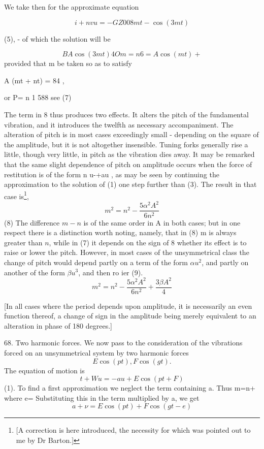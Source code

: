 We take then for the approximate equation

\[i+nvu=- GZ 008 mt -  \cos(3mt)\]

(5), - of which the solution will be

\[BA \cos(3mt) 4 Om =n 6 =A \cos(mt) +\]
 provided that m be taken so as to satisfy

A (mt + nt) = 84 ,

or P= n 1 588 see (7)

The term in 8 thus produces two effects. It alters the pitch of the fundamental
vibration, and it introduces the twelfth as necessary accompaniment. The
alteration of pitch is in most cases exceedingly small - depending on the
square of the amplitude, but it is not altogether insensible. Tuning forks
generally rise a little, though very little, in pitch as the vibration dies
away. It may be remarked that the same slight dependence of pitch on amplitude
occurs when the force of restitution is of the form n u-+au , as may be seen by
continuing the approximation to the solution of (1) one step further than (3).
The result in that case is\footnote{[A correction is here introduced, the
necessity for which was pointed out to me by Dr Barton.]},
\[ m^2 = n^2 - \frac{5 \alpha^2 A^2 }{6 n^2} \]
 (8) The difference \(m-n\) is of the same
order in A in both cases; but in one respect there is a distinction worth
noting, namely, that in (8) m is always greater than \(n\), while in (7) it
depends on the sign of 8 whether its effect is to raise or lower the pitch.
However, in most cases of the unsymmetrical class the change of pitch would
depend partly on a term of the form \(\alpha u^2\), and partly on another of
the form  \(\beta u^3\),
and then ro ier (9).
\[ m^2 = n^2 - \frac{5 \alpha^2 A^2 }{6 n^2} + \frac{3\beta A^2 }{4} \]

[In all cases where the period depends upon amplitude, it is necessarily an
even function thereof, a change of sign in the amplitude being merely
equivalent to an alteration in phase of 180 degrees.]


68. Two harmonic forces.  We now pass to the consideration of the vibrations
forced on an unsymmetrical system by two harmonic forces
\[E \cos(pt), F \cos(gt).\]
 The equation of motion is
\[t+ Wu =-au + E \cos(pt+F)\]
 (1). To find a first
approximation we neglect the term containing a.  Thus m=n+ where e=
Substituting this in the term multiplied by a, we get
\[a + \nu = E \cos(pt) + F \cos(gt - e)\]

